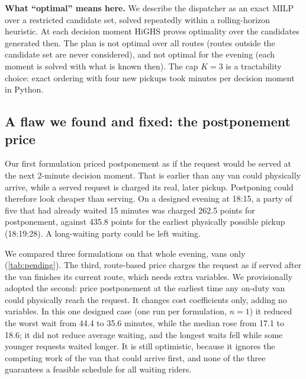 \documentclass{article}
\begin{document}
\textbf{What ``optimal'' means here.} We describe the dispatcher as an exact MILP over a restricted candidate set, solved repeatedly within a rolling-horizon heuristic. At each decision moment HiGHS proves optimality over the candidates generated then. The plan is not optimal over all routes (routes outside the candidate set are never considered), and not optimal for the evening (each moment is solved with what is known then). The cap $K=3$ is a tractability choice: exact ordering with four new pickups took minutes per decision moment in Python.



\subsection{A flaw we found and fixed: the postponement price}\label{sec:pending}
Our first formulation priced postponement as if the request would be served at the next 2-minute decision moment. That is earlier than any van could physically arrive, while a served request is charged its real, later pickup. Postponing could therefore look cheaper than serving. On a designed evening at 18:15, a party of five that had already waited 15 minutes was charged 262.5 points for postponement, against 435.8 points for the earliest physically possible pickup (18:19:28). A long-waiting party could be left waiting.

We compared three formulations on that whole evening, vans only (\cref{tab:pending}). The third, route-based price charges the request as if served after the van finishes its current route, which needs extra variables. We provisionally adopted the second: price postponement at the earliest time any on-duty van could physically reach the request. It changes cost coefficients only, adding no variables. In this one designed case (one run per formulation, $n = 1$) it reduced the worst wait from 44.4 to 35.6 minutes, while the median rose from 17.1 to 18.6; it did not reduce average waiting, and the longest waits fell while some younger requests waited longer. It is still optimistic, because it ignores the competing work of the van that could arrive first, and none of the three guarantees a feasible schedule for all waiting riders.
\end{document}
